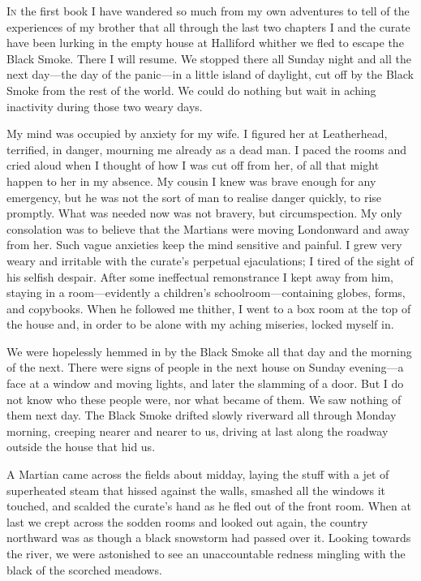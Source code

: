 

\lettrine[lines=4,findent=2pt]{I}{n} the first book I have wandered so much from my own adventures to tell of the experiences of my brother that all through the last two chapters I and the curate have been lurking in the empty house at Halliford whither we fled to escape the Black Smoke. There I will resume. We stopped there all Sunday night and all the next day—the day of the panic—in a little island of daylight, cut off by the Black Smoke from the rest of the world. We could do nothing but wait in aching inactivity during those two weary days.

My mind was occupied by anxiety for my wife. I figured her at Leatherhead, terrified, in danger, mourning me already as a dead man. I paced the rooms and cried aloud when I thought of how I was cut off from her, of all that might happen to her in my absence. My cousin I knew was brave enough for any emergency, but he was not the sort of man to realise danger quickly, to rise promptly. What was needed now was not bravery, but circumspection. My only consolation was to believe that the Martians were moving Londonward and away from her. Such vague anxieties keep the mind sensitive and painful. I grew very weary and irritable with the curate's perpetual ejaculations; I tired of the sight of his selfish despair. After some ineffectual remonstrance I kept away from him, staying in a room—evidently a children's schoolroom—containing globes, forms, and copybooks. When he followed me thither, I went to a box room at the top of the house and, in order to be alone with my aching miseries, locked myself in.

We were hopelessly hemmed in by the Black Smoke all that day and the morning of the next. There were signs of people in the next house on Sunday evening—a face at a window and moving lights, and later the slamming of a door. But I do not know who these people were, nor what became of them. We saw nothing of them next day. The Black Smoke drifted slowly riverward all through Monday morning, creeping nearer and nearer to us, driving at last along the roadway outside the house that hid us.

A Martian came across the fields about midday, laying the stuff with a jet of superheated steam that hissed against the walls, smashed all the windows it touched, and scalded the curate's hand as he fled out of the front room. When at last we crept across the sodden rooms and looked out again, the country northward was as though a black snowstorm had passed over it. Looking towards the river, we were astonished to see an unaccountable redness mingling with the black of the scorched meadows.

